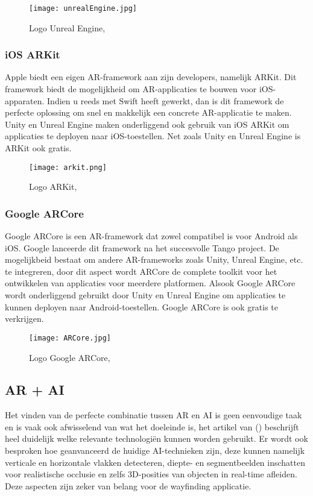 \begin{figure}[H]
	\centering
	\texttt{[image: unrealEngine.jpg]}
	\caption{Logo Unreal Engine, \autocite{UnrealEngine2019}}
\end{figure}

\subsubsection{iOS ARKit}
Apple biedt een eigen AR-framework aan zijn developers, namelijk ARKit. Dit framework biedt de mogelijkheid om AR-applicaties te bouwen voor iOS-apparaten. Indien u reeds met Swift heeft gewerkt, dan is dit framework de perfecte oplossing om snel en makkelijk een concrete AR-applicatie te maken. Unity en Unreal Engine maken onderliggend ook gebruik van iOS ARKit om applicaties te deployen naar iOS-toestellen. Net zoals Unity en Unreal Engine is ARKit ook gratis.
\begin{figure}[H]
	\centering
	\texttt{[image: arkit.png]}
	\caption{Logo ARKit, \autocite{Apple2019}}
\end{figure}

\subsubsection{Google ARCore}
Google ARCore is een AR-framework dat zowel compatibel is voor Android als iOS. Google lanceerde dit framework na het succesvolle Tango project.
De mogelijkbeid bestaat om andere AR-frameworks zoals Unity, Unreal Engine, etc.  te integreren, door dit aspect wordt ARCore de complete toolkit voor het ontwikkelen van applicaties voor meerdere platformen. Alsook Google ARCore wordt onderliggend gebruikt door Unity en Unreal Engine om applicaties te kunnen deployen naar Android-toestellen. Google ARCore is ook gratis te verkrijgen.

\begin{figure}[H]
	\centering
	\texttt{[image: ARCore.jpg]}
	\caption{Logo Google ARCore, \autocite{ARCore2019}}
\end{figure}

\subsection{AR + AI}
Het vinden van de perfecte combinatie tussen AR en AI is geen eenvoudige taak en is vaak ook afwisselend van wat het doeleinde is, het artikel van \textcite{Toole2019} () beschrijft heel duidelijk welke relevante technologiën kunnen worden gebruikt. Er wordt ook besproken hoe geanvanceerd de huidige AI-technieken zijn, deze kunnen namelijk  verticale en horizontale vlakken detecteren, diepte- en segmentbeelden inschatten voor realistische occlusie en zelfs 3D-posities van objecten in real-time afleiden. Deze aspecten zijn zeker van belang voor de wayfinding applicatie.

